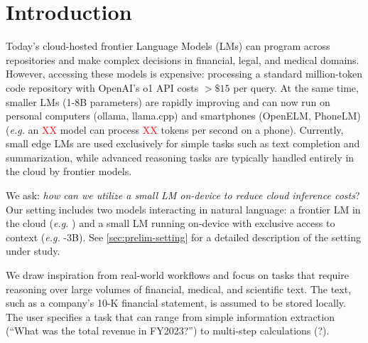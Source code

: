 


\section{Introduction}
\label{sec:intro}
Today's cloud-hosted frontier Language Models (LMs) can program across repositories and make complex decisions in financial, legal, and medical domains. However, accessing these models is expensive: processing a standard million-token code repository with OpenAI's o1 API costs $>\$15$ per query. 
% 
At the same time, smaller LMs (1-8B parameters) are rapidly improving and can now run on personal computers (ollama, llama.cpp) and smartphones (OpenELM, PhoneLM)  (\textit{e.g.} an \textcolor{red}{XX} model can process \textcolor{red}{XX} tokens per second on a phone). 
%
Currently, small edge LMs are used exclusively for simple tasks such as text completion and summarization, while advanced reasoning tasks are typically handled entirely in the cloud by frontier models. 


We ask: \textit{how can we utilize a small LM on-device to reduce cloud inference costs}? Our setting includes two models interacting in natural language: a frontier LM in the cloud (\textit{e.g.} \textit{\gpt}) and a small LM running on-device with exclusive access to context (\textit{e.g.} \llama-3B). See \cref{sec:prelim-setting} for a detailed description of the setting under study.

We draw inspiration from real-world workflows and focus on tasks that require reasoning over large volumes of financial, medical, and scientific text. The text, such as a company's 10-K financial statement, is assumed to be stored locally. The user specifies a task that can range from simple information extraction (``What was the total revenue in FY2023?'') to multi-step calculations (?).


